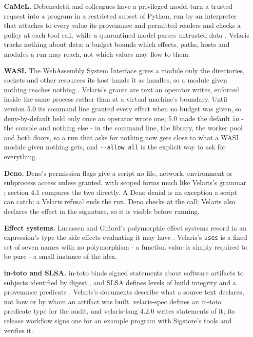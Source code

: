 \documentclass[
]{article}
\begin{document}
\textbf{CaMeL.} Debenedetti and colleagues have a privileged model turn
a trusted request into a program in a restricted subset of Python, run
by an interpreter that attaches to every value its provenance and
permitted readers and checks a policy at each tool call, while a
quarantined model parses untrusted data \citep{debenedetti2025camel}.
Velaris tracks nothing about data: a budget bounds which effects, paths,
hosts and modules a run may reach, not which values may flow to them.

\textbf{WASI.} The WebAssembly System Interface gives a module only the
directories, sockets and other resources its host hands it as handles,
so a module given nothing reaches nothing \citep{wasi}. Velaris's grants
are text an operator writes, enforced inside the same process rather
than at a virtual machine's boundary. Until version 5.0 its command line
granted every effect when no budget was given, so deny-by-default held
only once an operator wrote one; 5.0 made the default \texttt{io} - the
console and nothing else - in the command line, the library, the worker
pool and both doors, so a run that asks for nothing now gets close to
what a WASI module given nothing gets, and \texttt{-\/-allow\ all} is
the explicit way to ask for everything.

\textbf{Deno.} Deno's permission flags give a script no file, network,
environment or subprocess access unless granted, with scoped forms much
like Velaris's grammar \citep{deno_security}; section 4.1 compares the
two directly. A Deno denial is an exception a script can catch; a
Velaris refusal ends the run. Deno checks at the call; Velaris also
declares the effect in the signature, so it is visible before running.

\textbf{Effect systems.} Lucassen and Gifford's polymorphic effect
systems record in an expression's type the side effects evaluating it
may have \citep{lucassen1988effects}. Velaris's \texttt{uses} is a fixed
set of seven names with no polymorphism - a function value is simply
required to be pure - a small instance of the idea.

\textbf{in-toto and SLSA.} in-toto binds signed statements about
software artifacts to subjects identified by digest
\citep{torresarias2019intoto, intoto_attestation}, and SLSA defines
levels of build integrity and a provenance predicate \citep{slsa}.
Velaris's documents describe what a source text declares, not how or by
whom an artifact was built. velaris-spec defines an in-toto predicate
type for the audit, and velaris-lang 4.2.0 writes statements of it; its
release workflow signs one for an example program with Sigstore's tools
and verifies it.
\end{document}
